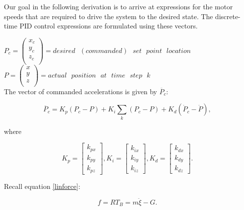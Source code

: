 Our goal in the following derivation is to arrive at expressions for the motor speeds that are required to drive the system to the desired state. The discrete-time PID control expressions are formulated using these vectors.


$P_c = \left( \begin{array}{c}
x_c\\y_c\\z_c\\
\end{array}\right) = desired\text{ } (commanded)\text{ }set\text{ }point\text{ }location $\\

$P = \left( \begin{array}{c}
x\\y\\z\\
\end{array}\right) = actual \text{ }position\text{ }at\text{ }time\text{ }step\text{ }k$\\

The vector of commanded accelerations is given by $\ddot{P_c}$:

\begin{equation}
    \label{eq:acc_comm}
    \ddot{P_c} = K_p(P_c - P) + K_i \sum_k (P_c-P) + K_d(\dot{P}_c - \dot{P}),
\end{equation}

where

\begin{equation}
 K_p = \left[ \begin{array}{c} k_{px} \\ k_{py} \\ k_{pz}  \end{array} \right] , K_i = \left[ \begin{array}{c} k_{ix} \\ k_{iy} \\ k_{iz}  \end{array} \right], K_d = \left[ \begin{array}{c} k_{dx} \\ k_{dy} \\ k_{dz}  \end{array} \right] .
\end{equation}


Recall equation \ref{linforce}:

\begin{equation}
    f =  R  T_B = m \ddot{ \xi} -  G.
\end{equation}

